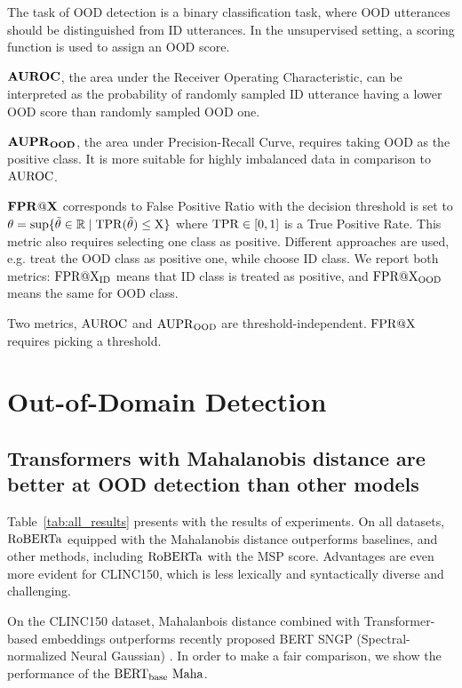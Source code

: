 \documentclass[letterpaper, final]{article} %
\begin{document}
The task of OOD detection is a binary classification task, where OOD utterances should be distinguished from ID utterances. In the unsupervised setting, a scoring function is used to assign an OOD score.


$\rm{\mathbf{AUROC}}$, the area under the Receiver Operating Characteristic, can be interpreted as the probability of randomly sampled ID utterance having a lower OOD score than randomly sampled OOD one.


$\rm{\mathbf{{AUPR}_{OOD}}}$, the area under Precision-Recall Curve, requires taking OOD as the positive class. It is more suitable for highly imbalanced data in comparison to $\rm{AUROC}$.


$\rm{\mathbf{FPR@X}} $ corresponds to False Positive Ratio with the decision threshold is set to
$
 \theta = \sup \{\tilde\theta \in \mathbb{R} \mid \rm{TPR}(\tilde\theta) \leq X \}
$
where $\rm{TPR} \in [0,1]$ is a True Positive Rate. This metric also requires selecting one class as positive. Different approaches are used, e.g. \citet*{ll_ratio_nlp_facebook} treat the OOD class as positive one, while \citet*{zheng2020out} choose ID class. We report both metrics:  $\rm{FPR@X}_{ID}$ means that ID class is treated as positive, and $\rm{FPR@X}_{OOD}$ means the same for OOD class.


Two metrics, $\rm{AUROC}$ and $\rm{AUPR}_{OOD}$ are threshold-independent. $\rm{FPR@X} $ requires picking a threshold.



\section{Out-of-Domain Detection}
\label{sec: experiments}
\subsection{Transformers with Mahalanobis distance  are better at OOD detection than other models}

Table~\ref{tab:all_results} presents with the results of experiments. On all datasets, $\rm{RoBERTa}$ equipped with the Mahalanobis distance outperforms baselines, and other methods, including $\rm{RoBERTa}$ with the MSP score. Advantages are even more evident for CLINC150, which is less lexically and syntactically diverse and challenging.

On the CLINC150 dataset, Mahalanbois distance combined with  Transformer-based embeddings outperforms recently proposed BERT SNGP (Spectral-normalized Neural Gaussian) \cite{liu2020simple}. In order to make a fair comparison, we show the performance of the $\rm{BERT_{base}\ Maha}$.
\end{document}
